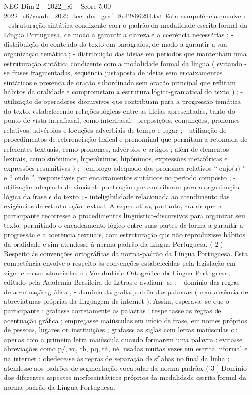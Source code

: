\begin{textsample}{NEG Dim 2 – 2022\_c6 – Score 5.00 – 2022\_c6/enade\_2022\_tec\_des\_graf\_8c42866294.txt}
Esta competência envolve : - estruturação sintática condizente com o padrão da modalidade escrita formal da Língua Portuguesa, de modo a garantir a clareza e a coerência necessárias ; - distribuição do conteúdo do texto em parágrafos, de modo a garantir a sua organização temática ; - distribuição das ideias em períodos que mantenham uma estruturação sintática condizente com a modalidade formal da língua ( evitando -se frases fragmentadas, sequência justaposta de ideias sem encaixamentos sintáticos e presença de oração subordinada sem oração principal que reflitam hábitos da oralidade e comprometam a estrutura lógico-gramatical do texto ) ; - utilização de operadores discursivos que contribuam para a progressão temática do texto, estabelecendo relações lógicas entre as ideias apresentadas, tanto do ponto de vista intrafrasal, como interfrasal : preposições, conjunções, pronomes relativos, advérbios e locuções adverbiais de tempo e lugar ; - utilização de procedimentos de referenciação lexical e pronominal que permitam a retomada de referentes textuais, como pronomes, advérbios e artigos ; além de elementos lexicais, como sinônimos, hiperônimos, hipônimos, expressões metafóricas e expressões resumitivas ) ; - emprego adequado dos pronomes relativos “ cujo(a) ” e “ onde ”, responsáveis por encaixamentos sintáticos no período composto ; - utilização adequada de sinais de pontuação que contribuam para a organização lógica da frase e do texto ; - inteligibilidade relacionada ao atendimento das exigências de estruturação textual.
A expectativa, portanto, era de que o participante recorresse a procedimentos linguístico-discursivos para organizar seu texto, permitindo o encadeamento lógico entre suas partes de forma a garantir a progressão e a coerência textuais, com estruturação que não reproduzisse hábitos da oralidade e sim atendesse à norma-padrão da Língua Portuguesa. ( 2 ) Respeito às convenções ortográficas da norma-padrão da Língua Portuguesa.
Esta competência envolve o respeito às convenções estabelecidas pela legislação em vigor e consubstanciadas no Vocabulário Ortográfico da Língua Portuguesa, editado pela Academia Brasileira de Letras e avaliam -se : - domínio das regras de acentuação gráfica ; - domínio da grafia padrão das palavras ( com ausência de abreviaturas próprias da linguagem da internet ).
Assim, esperava -se que o participante : grafasse corretamente as palavras ; respeitasse as regras de acentuação gráfica ; empregasse maiúsculas em início de frase, em nomes próprios de pessoas, lugares ou instituições ; grafasse as siglas com letras maiúsculas ou apenas com a primeira letra maiúscula quando formarem uma palavra ; evitasse abreviações como p/, vc, tb, pq, tá, né, usadas muitas vezes em escrita informal e na internet ; obedecesse às regras de separação de sílabas no final da linha ; atendesse aos padrões de segmentação vocabular da norma-padrão. ( 3 ) Domínio dos diferentes aspectos morfossintáticos próprios da modalidade escrita formal da norma-padrão da Língua Portuguesa.

\end{textsample}
